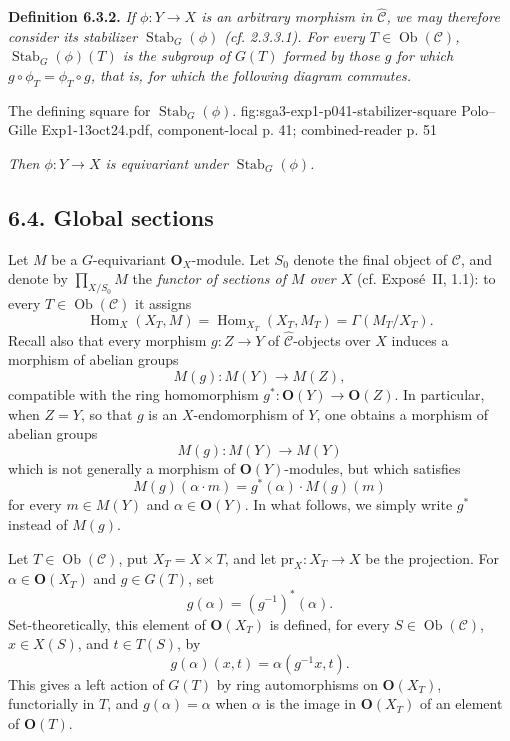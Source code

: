 \medskip
\noindent\textbf{Definition 6.3.2.}
\textit{If \(\phi:Y\to X\) is an arbitrary morphism in
\(\widehat{\mathscr C}\), we may therefore consider its stabilizer
\(\operatorname{Stab}_G(\phi)\) (cf. 2.3.3.1). For every
\(T\in\operatorname{Ob}(\mathscr C)\),
\(\operatorname{Stab}_G(\phi)(T)\) is the subgroup of \(G(T)\) formed
by those \(g\) for which \(g\circ\phi_T=\phi_T\circ g\), that is, for
which the following diagram commutes.}

  {The defining square for \(\operatorname{Stab}_G(\phi)\).}
  {fig:sga3-exp1-p041-stabilizer-square}
  {Polo--Gille Exp1-13oct24.pdf, component-local p. 41; combined-reader p. 51}

\textit{Then \(\phi:Y\to X\) is equivariant under
\(\operatorname{Stab}_G(\phi)\).}

\subsection*{6.4. Global sections}

Let \(M\) be a \(G\)-equivariant \(\mathbf O_X\)-module. Let \(S_0\)
denote the final object of \(\mathscr C\), and denote by
\(\prod_{X/S_0}M\) the \emph{functor of sections of \(M\) over \(X\)}
(cf. Expos\'e~II, 1.1): to every \(T\in\operatorname{Ob}(\mathscr C)\)
it assigns
\[
  \operatorname{Hom}_X(X_T,M)
  =\operatorname{Hom}_{X_T}(X_T,M_T)
  =\Gamma(M_T/X_T).
\]
Recall also that every morphism \(g:Z\to Y\) of
\(\widehat{\mathscr C}\)-objects over \(X\) induces a morphism of
abelian groups
\[
  M(g):M(Y)\longrightarrow M(Z),
\]
compatible with the ring homomorphism \(g^*:\mathbf O(Y)\to\mathbf
O(Z)\). In particular, when \(Z=Y\), so that \(g\) is an
\(X\)-endomorphism of \(Y\), one obtains a morphism of abelian groups
\[
  M(g):M(Y)\longrightarrow M(Y)
\]
which is not generally a morphism of \(\mathbf O(Y)\)-modules, but
which satisfies
\[
  M(g)(\alpha\cdot m)=g^*(\alpha)\cdot M(g)(m)
\]
for every \(m\in M(Y)\) and \(\alpha\in\mathbf O(Y)\). In what follows,
we simply write \(g^*\) instead of \(M(g)\).

Let \(T\in\operatorname{Ob}(\mathscr C)\), put \(X_T=X\times T\), and
let \(\mathrm{pr}_X:X_T\to X\) be the projection. For
\(\alpha\in\mathbf O(X_T)\) and \(g\in G(T)\), set
\[
  g(\alpha)=(g^{-1})^*(\alpha).
\]
Set-theoretically, this element of \(\mathbf O(X_T)\) is defined, for
every \(S\in\operatorname{Ob}(\mathscr C)\), \(x\in X(S)\), and
\(t\in T(S)\), by
\[
  g(\alpha)(x,t)=\alpha(g^{-1}x,t).
\]
This gives a left action of \(G(T)\) by ring automorphisms on
\(\mathbf O(X_T)\), functorially in \(T\), and \(g(\alpha)=\alpha\)
when \(\alpha\) is the image in \(\mathbf O(X_T)\) of an element of
\(\mathbf O(T)\).

